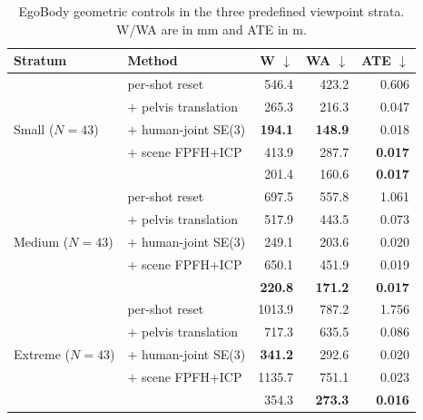 \begin{table}[t]
  \centering
  \caption{EgoBody geometric controls in the three predefined viewpoint
  strata. W/WA are in mm and ATE in m.}
  \label{tab:supp-registration-angle-eb}
  \supptablesize
  \setlength{\tabcolsep}{3.2pt}
  \begin{tabular}{llrrr}
    \toprule
    Stratum & Method & W $\downarrow$ & WA $\downarrow$ & ATE $\downarrow$ \\
    \midrule
    \multirow{5}{*}{Small ($N=43$)}
      & \humanthree{} per-shot reset & 546.4 & 423.2 & 0.606 \\
      & $+$ pelvis translation & 265.3 & 216.3 & 0.047 \\
      & $+$ human-joint SE(3) & \textbf{194.1} & \textbf{148.9} & 0.018 \\
      & $+$ scene FPFH+ICP & 413.9 & 287.7 & \textbf{0.017} \\
      & \method{} & 201.4 & 160.6 & \textbf{0.017} \\
    \midrule
    \multirow{5}{*}{Medium ($N=43$)}
      & \humanthree{} per-shot reset & 697.5 & 557.8 & 1.061 \\
      & $+$ pelvis translation & 517.9 & 443.5 & 0.073 \\
      & $+$ human-joint SE(3) & 249.1 & 203.6 & 0.020 \\
      & $+$ scene FPFH+ICP & 650.1 & 451.9 & 0.019 \\
      & \method{} & \textbf{220.8} & \textbf{171.2} & \textbf{0.017} \\
    \midrule
    \multirow{5}{*}{Extreme ($N=43$)}
      & \humanthree{} per-shot reset & 1013.9 & 787.2 & 1.756 \\
      & $+$ pelvis translation & 717.3 & 635.5 & 0.086 \\
      & $+$ human-joint SE(3) & \textbf{341.2} & 292.6 & 0.020 \\
      & $+$ scene FPFH+ICP & 1135.7 & 751.1 & 0.023 \\
      & \method{} & 354.3 & \textbf{273.3} & \textbf{0.016} \\
    \bottomrule
  \end{tabular}
\end{table}
